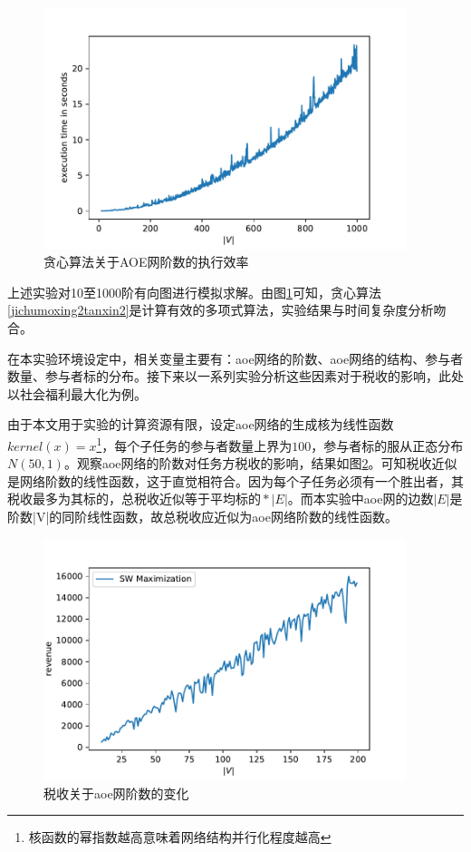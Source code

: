 \documentclass[promaster]{thesis-uestc}
\begin{document}
\begin{figure}[H]
    \includegraphics[width=300pt]{exp/exetime.pdf}
    \caption{贪心算法关于AOE网阶数的执行效率}
    \label{exetime}
\end{figure}

上述实验对10至1000阶有向图进行模拟求解。由图\ref{exetime}可知，贪心算法\ref{jichumoxing2tanxin2}是计算有效的多项式算法，实验结果与时间复杂度分析吻合。

在本实验环境设定中，相关变量主要有：aoe网络的阶数、aoe网络的结构、参与者数量、参与者标的分布。接下来以一系列实验分析这些因素对于税收的影响，此处以社会福利最大化为例。

由于本文用于实验的计算资源有限，设定aoe网络的生成核为线性函数$kernel(x)=x$\footnote{核函数的幂指数越高意味着网络结构并行化程度越高}，每个子任务的参与者数量上界为$100$，参与者标的服从正态分布$N(50,1)$。观察aoe网络的阶数对任务方税收的影响，结果如图\ref{revenuevsv}。可知税收近似是网络阶数的线性函数，这于直觉相符合。因为每个子任务必须有一个胜出者，其税收最多为其标的，总税收近似等于$\text{平均标的}*|E|$。而本实验中aoe网的边数$|E|$是阶数|V|的同阶线性函数，故总税收应近似为aoe网络阶数的线性函数。

\begin{figure}[H]
    \includegraphics[width=300pt]{exp/revenuevsv.pdf}
    \caption{税收关于aoe网阶数的变化}
    \label{revenuevsv}
\end{figure}
\end{document}
